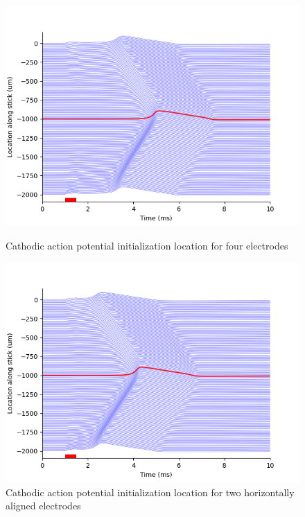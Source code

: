 \documentclass{article}
\begin{document}
    \begin{figure}[htbp]
        \centering
        \begin{minipage}[b]{0.3\textwidth}
            \includegraphics[width=\textwidth]{FE_all_cathodic_loc}
            \caption{Cathodic action potential initialization location for four electrodes}
            \label{fig:FE_all_cathodic_loc}
        \end{minipage}
        \hfill
        \begin{minipage}[b]{0.3\textwidth}
            \includegraphics[width=\textwidth]{FE_horizontal_cathodic_loc}
            \caption{Cathodic action potential initialization location for two horizontally aligned electrodes}
            \label{fig:FE_horizontal_cathodic_loc}

\end{minipage}
\end{figure}
\end{document}
